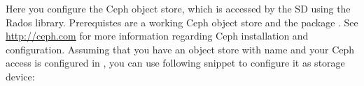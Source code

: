 
Here you configure the Ceph object store, which is accessed by the SD using the Rados library.
Prerequistes are a
working Ceph object store and the package .
See \url{http://ceph.com} for more information regarding Ceph installation and configuration.
Assuming that you have an object store with name 
and your Ceph access is configured in ,
you can use following snippet to configure it as storage device:

